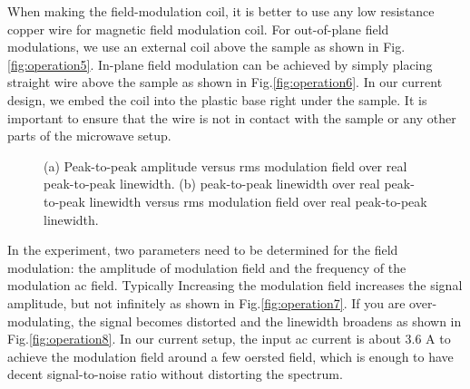  When making the field-modulation coil, it is better to use any low resistance copper wire for magnetic field modulation coil. For out-of-plane field modulations, we use an external coil above the sample as shown in Fig.\ref{fig:operation5}. In-plane field modulation can be achieved by simply placing straight wire above the sample as shown in Fig.\ref{fig:operation6}. In our current design, we embed the coil into the plastic base right under the sample. It is important to ensure that the wire is not in contact with the sample or any other parts of the microwave setup. 


\begin{figure}[h]
\centering
{}
\caption{(a) Peak-to-peak amplitude versus rms modulation field over real peak-to-peak linewidth. (b) peak-to-peak linewidth over real peak-to-peak linewidth versus rms modulation field over real peak-to-peak linewidth.}
\end{figure}

In the experiment, two parameters need to be determined for the field modulation: the amplitude of modulation field and the frequency of the modulation ac field. Typically Increasing the modulation field increases the signal amplitude, but not infinitely as shown in Fig.\ref{fig:operation7}. If you are over-modulating, the signal becomes distorted and the linewidth broadens as shown in Fig.\ref{fig:operation8}. In our current setup, the input ac current is about 3.6 A to achieve the modulation field around a few oersted field, which is enough to have decent signal-to-noise ratio without distorting the spectrum.






